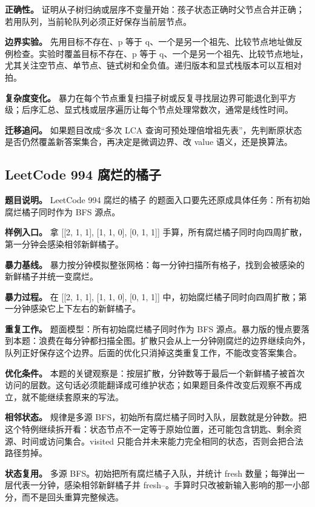 \textbf{正确性。} 证明从子树归纳或层序不变量开始：孩子状态正确时父节点合并正确；若用队列，当前轮队列必须正好保存当前层节点。

\textbf{边界实验。} 先用目标不存在、p 等于 q、一个是另一个祖先、比较节点地址做反例检查。实验时覆盖目标不存在、p 等于 q、一个是另一个祖先、比较节点地址，尤其关注空节点、单节点、链式树和全负值。递归版本和显式栈版本可以互相对拍。

\textbf{复杂度变化。} 暴力在每个节点重复扫描子树或反复寻找层边界可能退化到平方级；后序汇总、显式栈或层序遍历让每个节点处理常数次，通常是线性时间。

\textbf{迁移追问。} 如果题目改成“多次 LCA 查询可预处理倍增祖先表”，先判断原状态是否仍然覆盖新答案集合，再决定是微调边界、改 value 语义，还是换算法。

\subsection{LeetCode 994 腐烂的橘子}

\textbf{题目说明。} LeetCode 994 腐烂的橘子 的题面入口要先还原成具体任务：所有初始腐烂橘子同时作为 BFS 源点。

\textbf{样例入口。} 拿 [[2, 1, 1], [1, 1, 0], [0, 1, 1]] 手算，所有腐烂橘子同时向四周扩散，第一分钟会感染相邻新鲜橘子。

\textbf{暴力基线。} 暴力按分钟模拟整张网格：每一分钟扫描所有格子，找到会被感染的新鲜橘子并统一变腐烂。

\textbf{暴力过程。} 在 [[2, 1, 1], [1, 1, 0], [0, 1, 1]] 中，初始腐烂橘子同时向四周扩散；第一分钟感染它上下左右的新鲜橘子。

\textbf{重复工作。} 题面模型：所有初始腐烂橘子同时作为 BFS 源点。暴力版的慢点要落到本题：浪费在每分钟都扫描全图。扩散只会从上一分钟刚腐烂的边界继续向外，队列正好保存这个边界。后面的优化只消掉这类重复工作，不能改变答案集合。

\textbf{优化条件。} 本题的关键观察是：按层扩散，分钟数等于最后一个新鲜橘子被首次访问的层数。这句话必须能翻译成可维护状态；如果题目条件改变后观察不再成立，就不能继续套原来的写法。

\textbf{相邻状态。} 规律是多源 BFS，初始所有腐烂橘子同时入队，层数就是分钟数。把这个特例继续拆开看：状态节点不一定等于原始位置，还可能包含钥匙、剩余资源、时间或访问集合。visited 只能合并未来能力完全相同的状态，否则会把合法路径剪掉。

\textbf{状态复用。} 多源 BFS。初始把所有腐烂橘子入队，并统计 fresh 数量；每弹出一层代表一分钟，感染相邻新鲜橘子并 fresh--。手算时只改被新输入影响的那一小部分，而不是回头重算完整候选。

